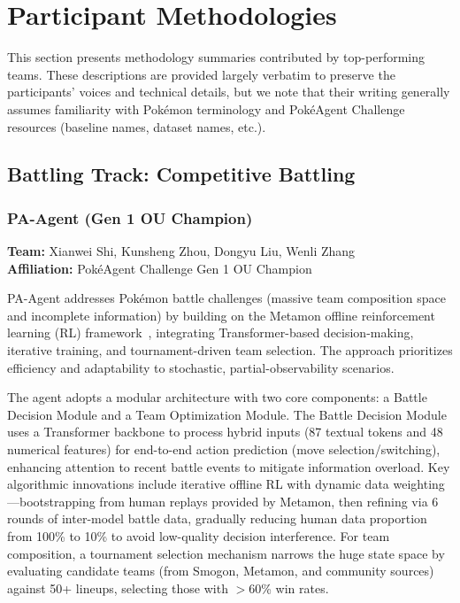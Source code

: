 \section{Participant Methodologies}
\label{sec:participant-methodologies}

This section presents methodology summaries contributed by top-performing teams. These descriptions are provided largely verbatim to preserve the participants' voices and technical details, but we note that their writing generally assumes familiarity with Pokémon terminology and PokéAgent Challenge resources (baseline names, dataset names, etc.).

\subsection{Battling Track: Competitive Battling}

\subsubsection{PA-Agent (Gen 1 OU Champion)}
\label{sec:pa-agent}

\textbf{Team:} Xianwei Shi, Kunsheng Zhou, Dongyu Liu, Wenli Zhang \\
\textbf{Affiliation:} PokéAgent Challenge Gen 1 OU Champion

PA-Agent addresses Pokémon battle challenges (massive team composition space and incomplete information) by building on the Metamon offline reinforcement learning (RL) framework~\citep{grigsby2025human}, integrating Transformer-based decision-making, iterative training, and tournament-driven team selection. The approach prioritizes efficiency and adaptability to stochastic, partial-observability scenarios.

The agent adopts a modular architecture with two core components: a Battle Decision Module and a Team Optimization Module. The Battle Decision Module uses a Transformer backbone to process hybrid inputs (87 textual tokens and 48 numerical features) for end-to-end action prediction (move selection/switching), enhancing attention to recent battle events to mitigate information overload. Key algorithmic innovations include iterative offline RL with dynamic data weighting---bootstrapping from human replays provided by Metamon, then refining via 6 rounds of inter-model battle data, gradually reducing human data proportion from 100\% to 10\% to avoid low-quality decision interference. For team composition, a tournament selection mechanism narrows the huge state space by evaluating candidate teams (from Smogon, Metamon, and community sources) against 50+ lineups, selecting those with $>$60\% win rates.

